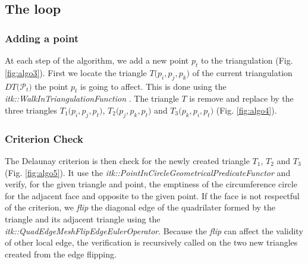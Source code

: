 \documentclass{InsightArticle}
\begin{document}
\subsection{The loop}

\subsubsection{Adding a point}

At each step of the algorithm, we add a new point $\mathit{p_{t}}$ to the triangulation (Fig. \ref{fig:algo3}). First we locate the triangle $\mathit{T}(\mathit{p_{i}},\mathit{p_{j}},\mathit{p_{k})}$ of the current triangulation $\mathit{DT(}\mathcal{P}_{\mathit{t}}\mathit{)}$ the point $\mathit{p_{t}}$ is going to affect. This is done using the \emph{itk::WalkInTriangulationFunction} \cite{Rigaud2012}. The triangle $\mathit{T}$ is remove and replace by the three triangles $\mathit{T}_{1}(\mathit{p_{i}},\mathit{p_{j}},\mathit{p_{t})}$, $\mathit{T}_{2}(\mathit{p_{j}},\mathit{p_{k}},\mathit{p_{t})}$ and $\mathit{T}_{3}(\mathit{p_{k}},\mathit{p_{i}},\mathit{p_{t})}$ (Fig. \ref{fig:algo4}).

\subsubsection{Criterion Check}

The Delaunay criterion is then check for the newly created triangle $\mathit{T}_{1}$, $\mathit{T}_{2}$ and $\mathit{T}_{3}$ (Fig. \ref{fig:algo5}). It use the \emph{itk::PointInCircleGeometricalPredicateFunctor} \cite{Moreau2011} and verify, for the given triangle and point, the emptiness of the circumference circle for the adjacent face and opposite to the given point. If the face is not respectful of the criterion, we \emph{flip} the diagonal edge of the quadrilater formed by the triangle and its adjacent triangle using the \emph{itk::QuadEdgeMeshFlipEdgeEulerOperator}. Because the \emph{flip} can affect the validity of other local edge, the verification is recursively called on the two new triangles created from the edge flipping.
\end{document}

